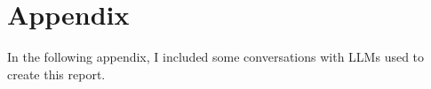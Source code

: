 \documentclass[9pt,a4paper,twocolumn,twoside]{tau-class/tau}
\begin{document}
    


\printbibliography


\section*{Appendix}
In the following appendix, I included some conversations with LLMs used to create this report.




\end{document}

